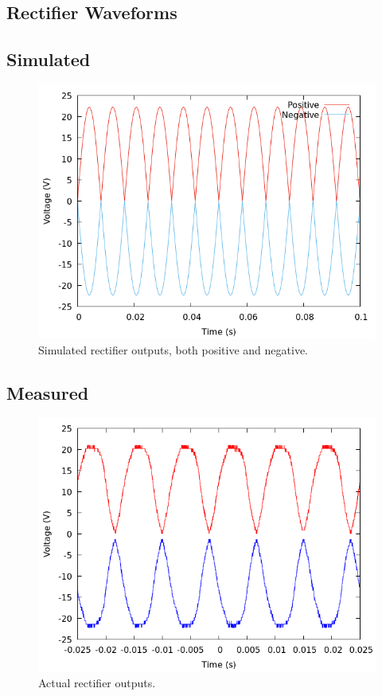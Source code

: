 \documentclass[12pt]{article}
\newcommand{\graphwidth}{0.5\linewidth}
\begin{document}
\begin{appendix}

\section{Rectifier Waveforms}

\subsection{Simulated}

\begin{figure}[H]
    \centering
    \includegraphics[width=\graphwidth]{./res/image/sim-rectifier-unfiltered.png}
    \caption{Simulated rectifier outputs, both positive and negative.}
    \label{sim:rectifier_unfiltered}
\end{figure}

\subsection{Measured}

\begin{figure}[H]
    \centering
    \includegraphics[width=\graphwidth]{./res/image/rectifier-output.png}
    \caption{Actual rectifier outputs.}
    \label{fig:rectifier_unfiltered}
\end{figure}


\end{appendix}
\end{document}
